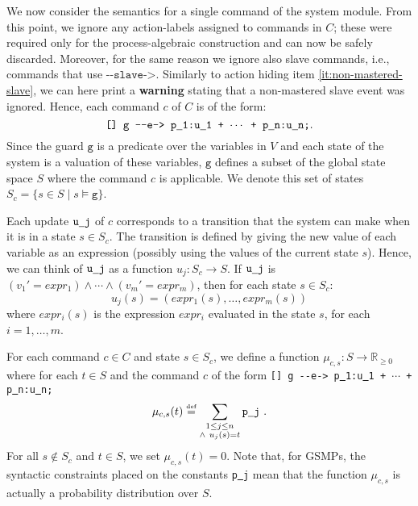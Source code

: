 \documentclass{article}
\newcommand{\eqdef}{\ensuremath{\stackrel{\text{\tiny def}}{=}}}
\newcommand{\arci}[1]{{-}{-}{#1}->}
\newcommand{\Rsetpo}{\mathbb{R}_{\ge 0}}
\newcommand{\calE}{\mathcal{E}}
\renewcommand{\_}{\underline{~}}
\newcommand{\events}{{\calE}}
\newcommand{\suc}{Succ}
\newcommand{\code}[1]{\texttt{#1}}
\begin{document}
We now consider the semantics for a single command of the system module. 
From this point, we ignore any action-labels assigned to commands in $C$; these were required only for the process-algebraic construction and can now be safely discarded.
Moreover, for the same reason we ignore also slave commands, i.e., commands that use $\code{\arci{slave}}$. Similarly to action hiding item \ref{it:non-mastered-slave}, we can here print a \textbf{warning} stating that a non-mastered slave event was ignored.
Hence, each command $c$ of $C$ is of the form:
$$\code{[] g \arci{e} p\_1:u\_1 + $\cdots$ + p\_n:u\_n;}.$$
%
Since the guard $\code{g}$ is a predicate over the variables in $V$ and each state of the system is a valuation of these variables, $\code{g}$ defines a subset of the global state space $S$ where the command $c$ is applicable. 
We denote this set of states $S_c = \{s \in S \mid s \models \code{g}\}$.

Each update $\code{u\_j}$ of $c$ corresponds to a transition that the system can make when it is in a state $s \in S_c$. 
The transition is defined by giving the new value of each variable as an expression (possibly using the values of the current state $s$).
Hence, we can think of $\code{u\_j}$ as a function $u_j\colon S_c \to S$.
If $\code{u\_j}$ is $(v_1' = expr_1)\wedge \cdots \wedge (v_m'
= expr_m)$, then for each state $s \in S_c$:
$$
u_j(s) = (expr_1(s), \ldots, expr_m(s))
$$
where $expr_i(s)$ is the expression $expr_i$ evaluated in the state $s$, for each $i=1,\dots,m$.
%

For each command $c \in C$ and state $s \in S_c$, we define a function $\mu_{c,s} \colon S \to \mathbb{R}_{\geq0}$ where for each $t\in S$ and the command $c$ of the form \code{[] g \arci{e} p\_1:u\_1 + $\cdots$ + p\_n:u\_n;}
\[ \mu_{c,s}(t) \eqdef \sum_{\substack{
		1 \leq j \leq n \\
		\wedge~ u_j(s) = t }}             \code{p\_j} ~.
\]
For all $s\not\in S_c$ and $t \in S$, we set $\mu_{c,s}(t)=0$.
Note that, for GSMPs, the syntactic constraints placed on the constants 
\code{p\_j} mean that the function $\mu_{c,s}$ is actually a probability distribution over $S$.

\end{document}
